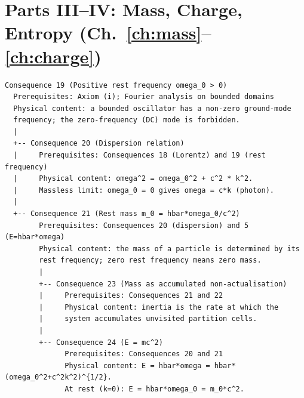 \section*{Parts III--IV: Mass, Charge, Entropy (Ch.~\ref{ch:mass}--\ref{ch:charge})}

\begin{center}
\small\ttfamily
\begin{verbatim}
Consequence 19 (Positive rest frequency omega_0 > 0)
  Prerequisites: Axiom (i); Fourier analysis on bounded domains
  Physical content: a bounded oscillator has a non-zero ground-mode
  frequency; the zero-frequency (DC) mode is forbidden.
  |
  +-- Consequence 20 (Dispersion relation)
  |     Prerequisites: Consequences 18 (Lorentz) and 19 (rest frequency)
  |     Physical content: omega^2 = omega_0^2 + c^2 * k^2.
  |     Massless limit: omega_0 = 0 gives omega = c*k (photon).
  |
  +-- Consequence 21 (Rest mass m_0 = hbar*omega_0/c^2)
        Prerequisites: Consequences 20 (dispersion) and 5 (E=hbar*omega)
        Physical content: the mass of a particle is determined by its
        rest frequency; zero rest frequency means zero mass.
        |
        +-- Consequence 23 (Mass as accumulated non-actualisation)
        |     Prerequisites: Consequences 21 and 22
        |     Physical content: inertia is the rate at which the
        |     system accumulates unvisited partition cells.
        |
        +-- Consequence 24 (E = mc^2)
              Prerequisites: Consequences 20 and 21
              Physical content: E = hbar*omega = hbar*(omega_0^2+c^2k^2)^{1/2}.
              At rest (k=0): E = hbar*omega_0 = m_0*c^2.


\end{verbatim}
\end{center}
